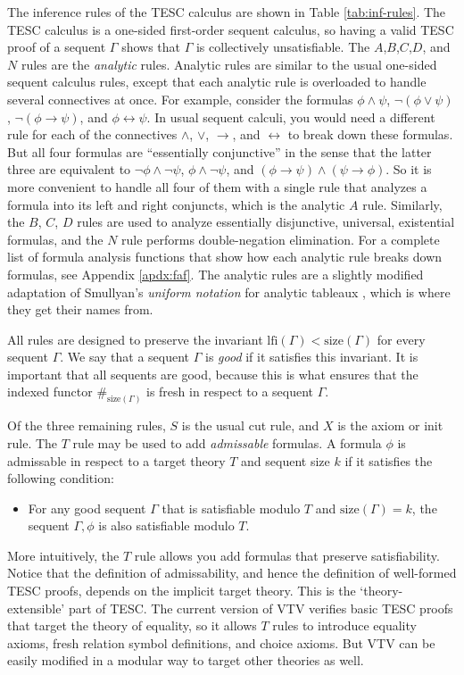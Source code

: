 \documentclass{lipics-v2021}
\newcommand{\idf}[1]{\#_{#1}}
\newcommand{\lfi}[0]{\mathrm{lfi}}
\newcommand{\limp}[0]{\to}
\newcommand{\liff}[0]{\leftrightarrow}
\newcommand{\size}[0]{\mathrm{size}}
\begin{document}
The inference rules of the TESC calculus are shown in Table \ref{tab:inf-rules}.
The TESC calculus is a one-sided first-order sequent calculus, so having 
a valid TESC proof of a sequent $\Gamma$ shows that $\Gamma$ is collectively unsatisfiable.
The $A$,$B$,$C$,$D$, and $N$ rules are the \textit{analytic} rules. 
Analytic rules are similar to the usual one-sided sequent calculus rules, 
except that each analytic rule is overloaded to handle several connectives at once. 
For example, consider the formulas $\phi \land \psi$, $\lnot (\phi \lor \psi)$, 
$\lnot (\phi \limp \psi)$, and $\phi \liff \psi$. In usual sequent calculi, you would 
need a different rule for each of the connectives $\land$, $\lor$, $\limp$, and $\liff$ to 
break down these formulas. But all four formulas are ``essentially conjunctive'' 
in the sense that the latter three are equivalent to $\lnot \phi \land \lnot \psi$, 
$\phi \land \lnot \psi$, and $(\phi \limp \psi) \land (\psi \limp \phi)$.
So it is more convenient to handle all four of them with a single rule that analyzes 
a formula into its left and right conjuncts, which is the analytic $A$ rule.
Similarly, the $B$, $C$, $D$ rules are used to analyze essentially disjunctive, 
universal, existential formulas, and the $N$ rule performs double-negation elimination. 
For a complete list of formula analysis functions that show how each analytic 
rule breaks down formulas, see Appendix \ref{apdx:faf}. The analytic rules are 
a slightly modified adaptation of Smullyan's \textit{uniform notation} for analytic 
tableaux \cite{smullyan1995first}, which is where they get their names from. 

All rules are designed to preserve the invariant $\lfi(\Gamma) < \size(\Gamma)$ 
for every sequent $\Gamma$. We say that a sequent $\Gamma$ is \textit{good} if it satisfies 
this invariant. It is important that all sequents are good, because this is what ensures 
that the indexed functor $\idf{\size(\Gamma)}$ is fresh in respect to a sequent $\Gamma$.

Of the three remaining rules, $S$ is the usual cut rule, and $X$ is the axiom or init rule. 
The $T$ rule may be used to add \textit{admissable} formulas. A formula $\phi$ is admissable 
in respect to a target theory $T$ and sequent size $k$ if it satisfies the following condition:  
\begin{itemize}
  \item For any good sequent $\Gamma$ that is satisfiable modulo $T$ and $\size(\Gamma) = k$, the 
sequent $\Gamma, \phi$ is also satisfiable modulo $T$. 
\end{itemize}
More intuitively, the $T$ rule allows you add formulas that preserve satisfiability. 
Notice that the definition of admissability, and hence the definition of well-formed 
TESC proofs, depends on the implicit target theory. This is the `theory-extensible' part of TESC. 
The current version of VTV verifies basic TESC proofs that target the theory of equality, so it allows $T$ 
rules to introduce equality axioms, fresh relation symbol definitions, and choice axioms.
But VTV can be easily modified in a modular way to target other theories as well.
\end{document}
